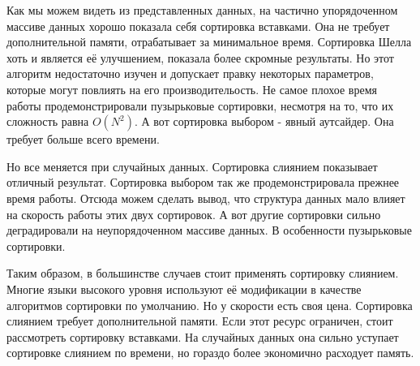 Как мы можем видеть из представленных данных, на частично упорядоченном массиве данных хорошо
показала себя сортировка вставками. Она не требует дополнительной памяти, отрабатывает за минимальное время.
Сортировка Шелла хоть и является её улучшением, показала более скромные результаты. Но этот алгоритм 
недостаточно изучен и допускает правку некоторых параметров, которые могут повлиять на его производительость.
Не самое плохое время работы продемонстрировали пузырьковые сортировки, несмотря на то, что их сложность
равна $O(N^2)$. А вот сортировка выбором - явный аутсайдер. Она требует больше всего времени.\par
Но все меняется при случайных данных. Сортировка слиянием показывает отличный результат. Сортировка выбором
так же продемонстрировала прежнее время работы. Отсюда можем сделать вывод, что структура данных мало влияет на
скорость работы этих двух сортировок. А вот другие сортировки сильно деградировали на неупорядоченном
массиве данных. В особенности пузырьковые сортировки.\par
Таким образом, в большинстве случаев стоит применять сортировку слиянием. Многие языки высокого уровня
используют её модификации в качестве алгоритмов сортировки по умолчанию. Но у скорости есть своя цена.
Сортировка слиянием требует дополнительной памяти. Если этот ресурс ограничен, стоит рассмотреть сортировку
вставками. На случайных данных она сильно уступает сортировке слиянием по времени, но гораздо более экономично
расходует память.